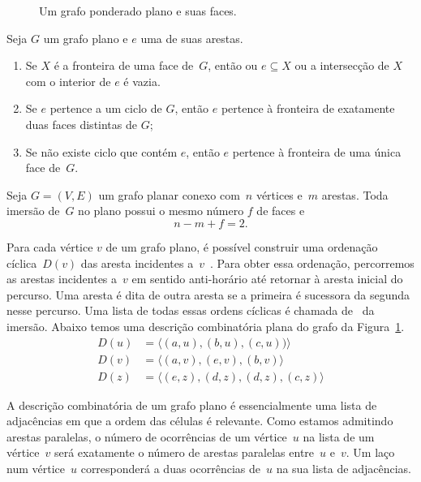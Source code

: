 \begin{figure}[htb]
\scalebox{1.5}{
\centering

}
\caption{Um grafo ponderado plano e suas faces.}
\label{fig:MSF-basico-0}
\end{figure}



\begin{lemma}
\label{lemma:diestel}
Seja $G$ um grafo plano e $e$ uma de suas arestas.
\begin{enumerate}
\item Se $X$ é a fronteira de uma face de~$G$, então ou $e\subseteq X$ ou a intersecção de $X$ com o interior de $e$ é vazia.
\item Se $e$ pertence a um ciclo de $G$, então $e$ pertence à fronteira de exatamente duas faces distintas de $G$;
\item Se não existe ciclo que contém $e$, então $e$ pertence à fronteira de uma única face de~$G$.
\end{enumerate}
\end{lemma}

\begin{theorem}
\label{teo:MSFEuler}
Seja $G=(V,E)$ um grafo planar conexo com~$n$ vértices e~$m$ arestas. Toda imersão de~$G$ no plano possui o mesmo número $f$ de faces e
$$
n-m+f = 2.
$$
\end{theorem}

Para cada vértice $v$ de um grafo plano, é possível construir uma ordenação cíclica~$D(v)$ das aresta incidentes a~$v$~\cite{noma2003}.
Para obter essa ordenação, percorremos as arestas incidentes a~$v$ em sentido anti-horário até retornar à aresta inicial do percurso.
Uma aresta é dita  de outra aresta se a primeira é sucessora da segunda nesse percurso.
Uma lista de todas essas ordens cíclicas é chamada de~ da imersão.
Abaixo temos uma descrição combinatória plana do grafo da Figura~\ref{fig:MSF-basico-0}.
\begin{align*}
D(u)&=\langle (a,u), (b,u), (c,u))\rangle\\
D(v)&=\langle (a,v), (e,v), (b,v)  \rangle\\
D(z)&=\langle (e,z), (d,z), (d,z), (c,z)\rangle
\end{align*}

A descrição combinatória de um grafo plano é essencialmente uma lista de adjacências em que a ordem das células é relevante.
Como estamos admitindo arestas paralelas, o número de ocorrências de um vértice~$u$ na lista de um vértice~$v$ será exatamente o número de arestas paralelas entre~$u$ e~$v$.
Um laço num vértice~$u$ corresponderá a duas ocorrências de~$u$ na sua lista de adjacências.

